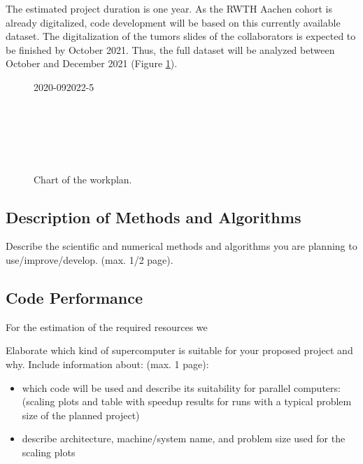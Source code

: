 \documentclass[12pt]{article}
\begin{document}
The estimated project duration is one year. As the RWTH Aachen cohort is already digitalized, code development will be based on this currently available dataset. The digitalization of the tumors slides of the collaborators is expected to be finished by October 2021. Thus, the full dataset will be analyzed between October and December 2021 (Figure \ref{fig:chart}).

\begin{figure}[htp]
\begin{ganttchart}[y unit title=0.6cm,
y unit chart=0.5cm,
hgrid,vgrid,
	time slot format=isodate-yearmonth,
	time slot unit=month,
	title height=.75, title top shift=0,
	bar height=0.6]{2020-09}{2022-5}
	 \\
	\\
	\\
	\\
	\\
	\\
\end{ganttchart}
\caption{Chart of the workplan.}
\label{fig:chart}
\end{figure}

\subsection{Description of Methods and Algorithms}
Describe the scientific and numerical methods and algorithms you are planning to use/improve/develop. (max. 1/2 page).

\subsection{Code Performance}
For the estimation of the required resources we


Elaborate which kind of supercomputer is suitable for your proposed project and why. Include information about: (max. 1 page):
\begin{itemize}
	\item which code will be used and describe its suitability for parallel computers: (scaling plots and table with speedup results for runs with a typical problem size of the planned project)
	\item describe architecture, machine/system name, and problem size used for the scaling plots
\end{itemize}
\end{document}
